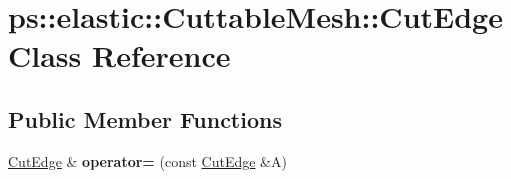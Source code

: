 \hypertarget{classps_1_1elastic_1_1CuttableMesh_1_1CutEdge}{}\section{ps\+:\+:elastic\+:\+:Cuttable\+Mesh\+:\+:Cut\+Edge Class Reference}
\label{classps_1_1elastic_1_1CuttableMesh_1_1CutEdge}
\subsection*{Public Member Functions}
\begin{DoxyCompactItemize}
\item 
\hypertarget{classps_1_1elastic_1_1CuttableMesh_1_1CutEdge_a177a87a0662ff1c2d75d1c91d87d1e80}{}\hyperlink{classps_1_1elastic_1_1CuttableMesh_1_1CutEdge}{Cut\+Edge} \& {\bfseries operator=} (const \hyperlink{classps_1_1elastic_1_1CuttableMesh_1_1CutEdge}{Cut\+Edge} \&A)\label{classps_1_1elastic_1_1CuttableMesh_1_1CutEdge_a177a87a0662ff1c2d75d1c91d87d1e80}

\end{DoxyCompactItemize}
